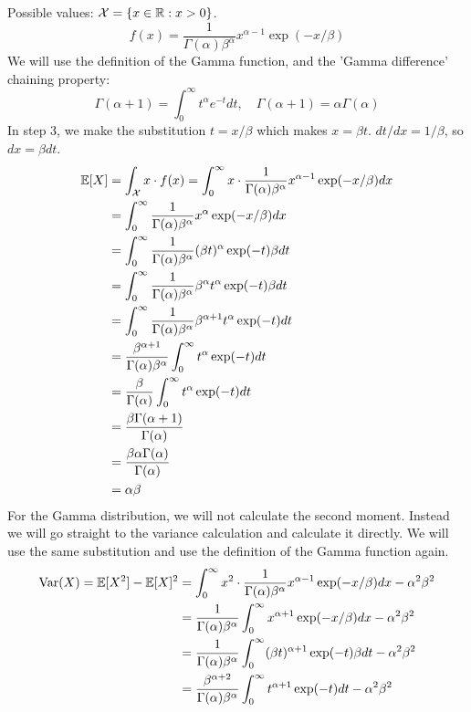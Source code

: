 Possible values: $\mathcal{X} = \{x\in\mathbb{R} : x > 0\}$. 
$$
f(x) = \frac{1}{\Gamma(\alpha)\beta^\alpha}x^{\alpha-1}\exp(-x/\beta)
$$
We will use the definition of the Gamma function, and the 'Gamma difference' chaining property:
$$
\Gamma(\alpha+1) = \int_0^\infty t^{\alpha}e^{-t}dt,\quad
\Gamma(\alpha+1) = \alpha\Gamma(\alpha)
$$
In step 3, we make the substitution $t = x/\beta$ which makes $x = \beta t$.
$dt/dx = 1/\beta$, so $dx = \beta dt$.
\begin{align*}
    \mathbb{E}[X] &= \int_{\mathcal{X}} x\cdot f(x)
    = \int_0^\infty x\cdot\frac{1}{\Gamma(\alpha)\beta^\alpha}x^{\alpha-1}\exp(-x/\beta) dx \\
    &= \int_0^\infty \frac{1}{\Gamma(\alpha)\beta^\alpha}x^{\alpha}\exp(-x/\beta) dx \\
    &= \int_0^\infty \frac{1}{\Gamma(\alpha)\beta^\alpha}(\beta t)^{\alpha}\exp(-t) \beta dt\\
    &= \int_0^\infty \frac{1}{\Gamma(\alpha)\beta^\alpha}\beta^\alpha t^{\alpha}\exp(-t) \beta dt\\
    &= \int_0^\infty \frac{1}{\Gamma(\alpha)\beta^\alpha}\beta^{\alpha+1} t^{\alpha}\exp(-t) dt\\
    &= \frac{\beta^{\alpha+1}}{\Gamma(\alpha)\beta^\alpha}\int_0^\infty t^{\alpha}\exp(-t) dt\\
    &= \frac{\beta}{\Gamma(\alpha)}\int_0^\infty t^{\alpha}\exp(-t) dt\\
    &= \frac{\beta\Gamma(\alpha + 1)}{\Gamma(\alpha)}\\
    &= \frac{\beta\alpha\Gamma(\alpha)}{\Gamma(\alpha)}\\
    &= \alpha\beta
\end{align*}
For the Gamma distribution, we will not calculate the second moment. Instead we will go straight to the
variance calculation and calculate it directly. We will use the same substitution and use the definition of
the Gamma function again.
\begin{align*}
    \text{Var}(X) = \mathbb{E}[X^2] - \mathbb{E}[X]^2 &= 
    \int_0^\infty x^2\cdot\frac{1}{\Gamma(\alpha)\beta^\alpha}x^{\alpha-1}\exp(-x/\beta) dx - \alpha^2\beta^2 \\
    &= \frac{1}{\Gamma(\alpha)\beta^\alpha}\int_0^\infty x^{\alpha+1}\exp(-x/\beta) dx - \alpha^2\beta^2 \\
    &= \frac{1}{\Gamma(\alpha)\beta^\alpha}\int_0^\infty (\beta t)^{\alpha+1}\exp(-t) \beta dt - \alpha^2\beta^2 \\
    &= \frac{\beta^{\alpha+2}}{\Gamma(\alpha)\beta^\alpha}\int_0^\infty t^{\alpha+1}\exp(-t) dt - \alpha^2\beta^2 
\end{align*}

